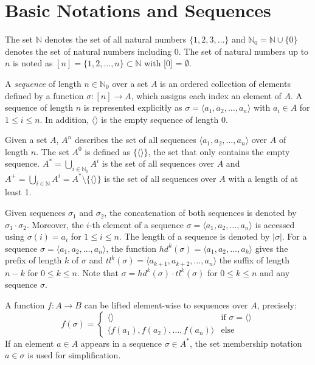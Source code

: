 \section{Basic Notations and Sequences}

The set $\mathbb{N}$ denotes the set of all natural numbers $\{1, 2, 3, \dots\}$ and $\mathbb{N}_0 = \mathbb{N} \cup \{0\}$ denotes the set of natural numbers including 0.
The set of natural numbers up to $n$ is noted as $[n] = \{1, 2, \dots, n\} \subset \mathbb{N}$ with [0] = $\emptyset$.

\begin{definition}[Sequence]
		A \textit{sequence} of length $n \in \mathbb{N}_0$ over a set $A$ is an ordered collection of elements defined by a function $\sigma \colon [n]\to A$, which assigns each index an element of $A$.
		A sequence  of length $n$ is represented explicitly as $\sigma = \langle a_1, a_2, \dots, a_n\rangle $ with $a_i \in A$ for $1 \leq i \leq n$. In addition, $\langle \rangle$ is the empty sequence of length $0$.
\end{definition}

Given a set $A$, $A^n$ describes the set of all sequences $\langle a_1, a_2, \dots, a_n\rangle$ over $A$ of length $n$.
The set $A^0$ is defined as $\{\langle \rangle\}$, the set that only contains the empty sequence.
$A^* = \bigcup\limits_{i\in \mathbb{N}_0} A^i$ is the set of all sequences over $A$ and $A^+ = \bigcup\limits_{i\in \mathbb{N}} A^i = A^* \setminus \{ \langle \rangle\}$ is the set of all sequences over $A$ with a length of at least 1.

Given sequences $\sigma_1$ and $\sigma_2$, the concatenation of both sequences is denoted by $\sigma_1 \cdot \sigma_2$.
Moreover, the $i$-th element of a sequence $\sigma = \langle a_1, a_2, \dots, a_n\rangle$ is accessed using $\sigma(i)= a_i$ for $1 \leq i \leq n$.
The length of a sequence is denoted by $|\sigma|$.
For a sequence $\sigma=\langle a_1, a_2, \dots, a_n\rangle$, the function
$hd^k(\sigma)= \langle a_1, a_2, \dots, a_k\rangle$ gives the prefix of length $k$ of $\sigma$ and $tl^k(\sigma)= \langle a_{k+1}, a_{k+2}, \dots, a_n\rangle$ the suffix of length $n-k$ for $0 \leq k \leq n$.
Note that $\sigma = hd^k(\sigma) \cdot tl^{k}(\sigma)$ for $0 \leq k \leq n$ and any sequence $\sigma$.

A function $f \colon A \to B$ can be lifted element-wise to sequences over $A$, precisely:
\begin{equation*}
f(\sigma) =
\begin{cases}
\langle \rangle & \text{if $\sigma = \langle \rangle$} \\
\langle f(a_1), f(a_2), \dots, f(a_n)\rangle & \text{else} 
\end{cases}
\end{equation*}
If an element $a \in A$ appears in a sequence $\sigma \in A^*$, the set membership notation $a \in \sigma$ is used for simplification.

